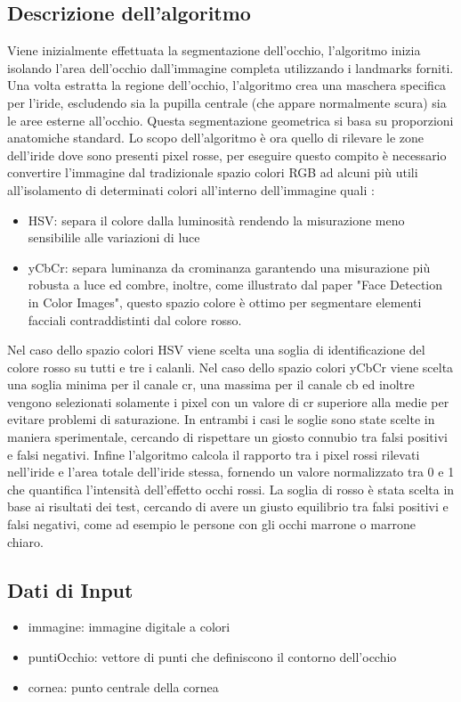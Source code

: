 \documentclass[12pt,a4paper,openright,twoside]{book}
\begin{document}
\subsection{Descrizione dell'algoritmo}
Viene inizialmente effettuata la segmentazione dell'occhio, l'algoritmo inizia isolando l'area dell'occhio dall'immagine completa utilizzando i landmarks forniti.
Una volta estratta la regione dell'occhio, l'algoritmo crea una maschera specifica per l'iride, escludendo sia la pupilla centrale (che appare normalmente scura) sia le aree esterne all'occhio. Questa segmentazione geometrica si basa su proporzioni anatomiche standard.
Lo scopo dell'algoritmo è ora quello di rilevare le zone dell'iride dove sono presenti pixel rosse, per eseguire questo compito è necessario convertire l'immagine dal tradizionale spazio colori RGB ad alcuni più utili all'isolamento di determinati colori all'interno dell'immagine quali : \begin{itemize}
    \item HSV: separa il colore dalla luminosità rendendo la misurazione meno sensibilile alle variazioni di luce
    \item yCbCr: separa luminanza da crominanza garantendo una misurazione più robusta a luce ed combre, inoltre, come illustrato dal paper "Face Detection in Color Images", questo spazio colore è ottimo per segmentare elementi facciali contraddistinti dal colore rosso.
\end{itemize}
Nel caso dello spazio colori HSV viene scelta una soglia di identificazione del colore rosso su tutti e tre i calanli.
Nel caso dello spazio colori yCbCr viene scelta una soglia minima per il canale cr, una massima per il canale cb ed inoltre vengono selezionati solamente i pixel con un valore di cr superiore alla medie per evitare problemi di saturazione.
In entrambi i casi le soglie sono state scelte in maniera sperimentale, cercando di rispettare un giosto connubio tra falsi positivi e falsi negativi.
Infine l'algoritmo calcola il rapporto tra i pixel rossi rilevati nell'iride e l'area totale dell'iride stessa, fornendo un valore normalizzato tra 0 e 1 che quantifica l'intensità dell'effetto occhi rossi.
La soglia di rosso è stata scelta in base ai risultati dei test, cercando di avere un giusto equilibrio tra falsi positivi e falsi negativi, come ad esempio le persone con gli occhi marrone o marrone chiaro.
\subsection{Dati di Input}
\begin{itemize}
    \item immagine: immagine digitale a colori
    \item puntiOcchio: vettore di punti che definiscono il contorno dell'occhio
    \item cornea: punto centrale della cornea
\end{itemize}
\end{document}
